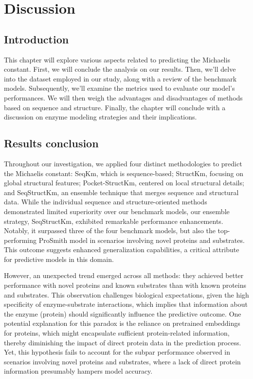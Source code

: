 
\chapter{Discussion}
\label{chap:6}

\section{Introduction}

This chapter will explore various aspects related to predicting the Michaelis constant. First, we will conclude the analysis on our results. Then, we'll delve into the dataset employed in our study, along with a review of the benchmark models. Subsequently, we'll examine the metrics used to evaluate our model's performances. We will then weigh the advantages and disadvantages of methods based on sequence and structure. Finally, the chapter will conclude with a discussion on enzyme modeling strategies and their implications.

\section{Results conclusion}
Throughout our investigation, we applied four distinct methodologies to predict the Michaelis constant: SeqKm, which is sequence-based; StructKm, focusing on global structural features; Pocket-StructKm, centered on local structural details; and SeqStructKm, an ensemble technique that merges sequence and structural data. While the individual sequence and structure-oriented methods demonstrated limited superiority over our benchmark models, our ensemble strategy, SeqStructKm, exhibited remarkable performance enhancements. Notably, it surpassed three of the four benchmark models, but also the top-performing ProSmith model in scenarios involving novel proteins and substrates. This outcome suggests enhanced generalization capabilities, a critical attribute for predictive models in this domain.

However, an unexpected trend emerged across all methods: they achieved better performance with novel proteins and known substrates than with known proteins and substrates. This observation challenges biological expectations, given the high specificity of enzyme-substrate interactions, which implies that information about the enzyme (protein) should significantly influence the predictive outcome. One potential explanation for this paradox is the reliance on pretrained embeddings for proteins, which might encapsulate sufficient protein-related information, thereby diminishing the impact of direct protein data in the prediction process. Yet, this hypothesis fails to account for the subpar performance observed in scenarios involving novel proteins and substrates, where a lack of direct protein information presumably hampers model accuracy.

